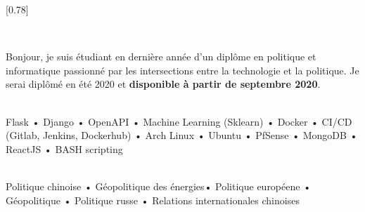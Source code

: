 \documentclass[withoutsidebar, hidelinks]{simplehipstercv}
\begin{document}
\setlength{\columnsep}{1cm}
[0.78]
\begin{paracol}{2}

  \paracolbackgroundoptions



  \footnotesize
  {\setasidefontcolour
    \flushright

    \\[0.5em]


    \justifying

    Bonjour, je suis étudiant en dernière année d'un diplôme en politique et informatique passionné par les intersections entre la technologie et la politique.
    Je serai diplômé en été 2020 et \textbf{disponible à partir de septembre 2020}.


    \flushright

    \bigskip

     \\[0.5em]

    Flask •
    Django •
    OpenAPI •
    Machine Learning (Sklearn) •
    Docker •
    CI/CD (Gitlab, Jenkins, Dockerhub) •
    Arch Linux •
    Ubuntu •
    PfSense •
    MongoDB •
    ReactJS •
    BASH scripting

    \bigskip

     \\[0.5em]

    Politique chinoise •
    Géopolitique des énergies•
    Politique européene •
    Géopolitique •
    Politique russe •
    Relations internationales chinoises

    \bigskip

     \\[0.5em]

}
\end{paracol}
\end{document}

